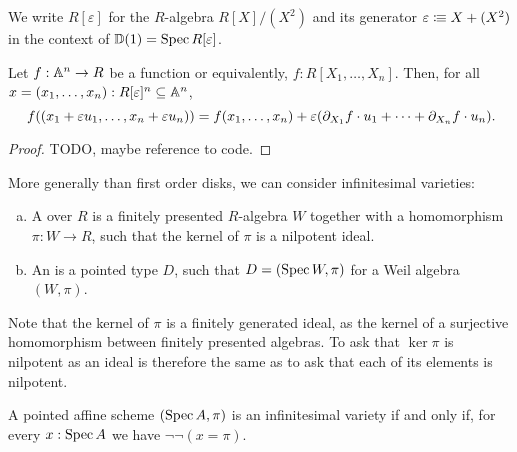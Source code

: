 \begin{definition}
  We write $R[\varepsilon]$ for the $R$-algebra $R[X]/(X^2)$ and its generator $\varepsilon\vcentcolon\mspace{-1.2mu}\equiv X+(X^2)$
  in the context of $\mathbb{D}(1)=\operatorname{Spec} R[\varepsilon]$.
\end{definition}

\begin{lemma}%
  \label{evaluate-on-first-order-disk}
  Let $f:\mathbb{A}^n\to R$ be a function or equivalently, $f:R[X_1,\dots,X_n]$.
  Then, for all $x=(x_1,\dots,x_n):R[\varepsilon]^n\subseteq\mathbb{A}^n$,
  \[
    f((x_1+\varepsilon u_1, \dots , x_n+\varepsilon u_n))=f(x_1,\dots,x_n)+\varepsilon(\partial_{X_1}f\cdot u_1+\dots+\partial_{X_n}f\cdot u_n)
    \rlap{.}
  \]
\end{lemma}

\begin{proof}
  TODO, maybe reference to code.
\end{proof}

More generally than first order disks, we can consider infinitesimal varieties:

\begin{definition}
  \begin{enumerate}[(a)]
  \item A  over $R$ is a finitely presented $R$-algebra
    $W$ together with a homomorphism $\pi : W \to R$, such that the kernel of $\pi$ is a nilpotent ideal.
  \item An  is a pointed type $D$,
    such that $D = (\operatorname{Spec} W, \pi)$ for a Weil algebra $(W, \pi)$.
  \end{enumerate}
\end{definition}

Note that the kernel of $\pi$ is a finitely generated ideal,
as the kernel of a surjective homomorphism between finitely presented algebras.
To ask that $\ker \pi$ is nilpotent as an ideal
is therefore the same as to ask that each of its elements is nilpotent.

\begin{lemma}%
  \label{characterization-infinitesimal-variety}
  A pointed affine scheme $(\operatorname{Spec} A, \pi)$
  is an infinitesimal variety
  if and only if,
  for every $x : \operatorname{Spec} A$ we have $\lnot \lnot (x = \pi)$.
\end{lemma}


